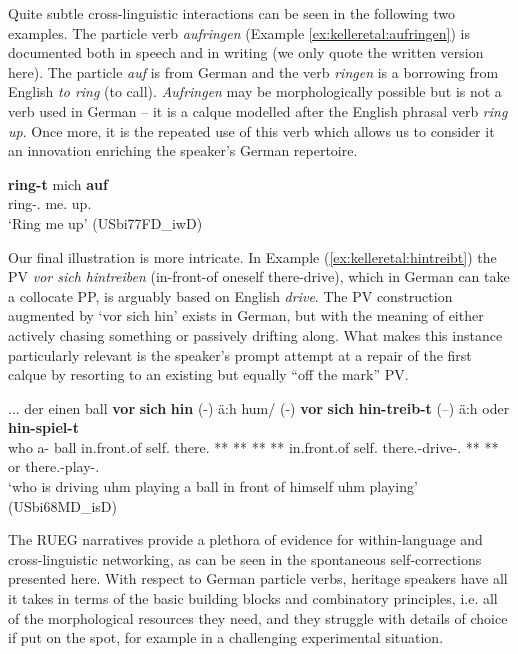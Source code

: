 \documentclass[output=paper,colorlinks,citecolor=brown]{langscibook}
\begin{document}
Quite subtle cross-linguistic interactions can be seen in the following two examples. The particle verb \textit{aufringen} (Example \ref{ex:kelleretal:aufringen}) is documented both in speech and in writing (we only quote the written version here). The particle \textit{auf} is from German and the verb \textit{ringen} is a borrowing from English \textit{to ring} (to call). \textit{Aufringen} may be morphologically possible but is not a verb used in German -- it is a calque modelled after the English phrasal verb \textit{ring up}. Once more, it is the repeated use of this verb which allows us to consider it an innovation enriching the speaker's German repertoire.

\ea
\label{ex:kelleretal:aufringen}
\gll \textbf{ring-t} mich \textbf{auf} \\
ring-\Prs.\Spl{} me.\Acc{} up.\Vpart{} \\
\glt `Ring me up' (USbi77FD\_iwD)
\z

Our final illustration is more intricate. In Example (\ref{ex:kelleretal:hintreibt}) the PV \textit{vor sich hintreiben} (in-front-of oneself there-drive), which in German can take a collocate PP, is arguably based on English \textit{drive}. The PV construction augmented by `vor sich hin' exists in German, but with the meaning of either actively chasing something or passively drifting along. What makes this instance particularly relevant is the speaker’s prompt attempt at a repair of the first calque by resorting to an existing but equally ``off the mark'' PV.

\ea
\label{ex:kelleretal:hintreibt}
\gll ... der einen ball \textbf{vor} \textbf{sich} \textbf{hin} (-) ä:h hum/ (-) \textbf{vor} \textbf{sich} \textbf{hin-treib-t} (--) ä:h oder \textbf{hin-spiel-t}\\
{} who a-\Acc{} ball in.front.of self.\Refl{} there.\Vpart{} {**} {**} {**} {**} in.front.of self.\Refl{} there.\Vpart{}-drive-\Prs.\Tsg{} {**} {**} or there.\Vpart{}-play-\Prs.\Tsg{} \\
\glt `who is driving uhm playing a ball in front of himself uhm playing' (USbi68MD\_isD)
\z

The RUEG narratives provide a plethora of evidence for within-language and cross-linguistic networking, as can be seen in the spontaneous self-corrections presented here. With respect to German particle verbs, heritage speakers have all it takes in terms of the basic building blocks and combinatory principles, i.e. all of the morphological resources they need, and they struggle with details of choice if put on the spot, for example in a challenging experimental situation. 
\end{document}
